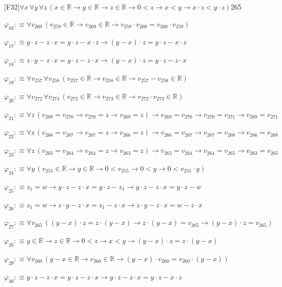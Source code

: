 \begin{fullproof}{[F32]}{$\forall x\,\forall y\,\forall z\,(x \in \mathbb{R} \to y \in \mathbb{R} \to z \in \mathbb{R} \to 0 < z \to x < y \to x \cdot z < y \cdot z)$}{265}
\begin{abbrevlist}
\item $\varphi_{16} :\equiv \forall v_{260}\,(v_{259} \in \mathbb{R} \to v_{260} \in \mathbb{R} \to v_{259} \cdot v_{260} = v_{260} \cdot v_{259})$
\item $\varphi_{17} :\equiv y \cdot z - z \cdot x = y \cdot z - x \cdot z \to (y - x) \cdot z = y \cdot z - x \cdot z$
\item $\varphi_{18} :\equiv z \cdot y - z \cdot x = y \cdot z - z \cdot x \to (y - x) \cdot z = y \cdot z - z \cdot x$
\item $\varphi_{19} :\equiv \forall v_{257}\,\forall v_{258}\,(v_{257} \in \mathbb{R} \to v_{258} \in \mathbb{R} \to v_{257} - v_{258} \in \mathbb{R})$
\item $\varphi_{20} :\equiv \forall v_{272}\,\forall v_{273}\,(v_{272} \in \mathbb{R} \to v_{273} \in \mathbb{R} \to v_{272} \cdot v_{273} \in \mathbb{R})$
\item $\varphi_{21} :\equiv \forall z\,(v_{269} = v_{270} \to v_{270} = z \to v_{269} = z) \to v_{269} = v_{270} \to v_{270} = v_{271} \to v_{269} = v_{271}$
\item $\varphi_{22} :\equiv \forall z\,(v_{266} = v_{267} \to v_{267} = z \to v_{266} = z) \to v_{266} = v_{267} \to v_{267} = v_{268} \to v_{266} = v_{268}$
\item $\varphi_{23} :\equiv \forall z\,(v_{263} = v_{264} \to v_{264} = z \to v_{263} = z) \to v_{263} = v_{264} \to v_{264} = v_{265} \to v_{263} = v_{265}$
\item $\varphi_{24} :\equiv \forall y\,(v_{255} \in \mathbb{R} \to y \in \mathbb{R} \to 0 < v_{255} \to 0 < y \to 0 < v_{255} \cdot y)$
\item $\varphi_{25} :\equiv z_{1} = w \to y \cdot z - z \cdot x = y \cdot z - z_{1} \to y \cdot z - z \cdot x = y \cdot z - w$
\item $\varphi_{26} :\equiv z_{1} = w \to z \cdot y - z \cdot x = z_{1} - z \cdot x \to z \cdot y - z \cdot x = w - z \cdot x$
\item $\varphi_{27} :\equiv \forall v_{265}\,((y - x) \cdot z = z \cdot (y - x) \to z \cdot (y - x) = v_{265} \to (y - x) \cdot z = v_{265})$
\item $\varphi_{28} :\equiv y \in \mathbb{R} \to z \in \mathbb{R} \to 0 < z \to x < y \to (y - x) \cdot z = z \cdot (y - x)$
\item $\varphi_{29} :\equiv \forall v_{260}\,(y - x \in \mathbb{R} \to v_{260} \in \mathbb{R} \to (y - x) \cdot v_{260} = v_{260} \cdot (y - x))$
\item $\varphi_{30} :\equiv y \cdot z - z \cdot x = y \cdot z - z \cdot x \to y \cdot z - z \cdot x = y \cdot z - x \cdot z$

\end{abbrevlist}
\end{fullproof}
